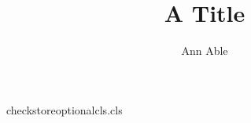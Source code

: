 \begin{filecontents*}[force]{checkstoreoptionalcls.cls}
\newcount\aucount
\def\author#1{\advance\aucount by 1 \gdef\@author{#1}}
\def\auaddr{}\newcommand{\address}[2][]{\g@addto@macro\auaddr{#1 #2\par}}
\def\place[#1]#2{\g@addto@macro\auaddr{#1 #2\par}}
\renewcommand\maketitle{\par{\@title\par}\ifnum\aucount>0 {\@author\par}{\auaddr}\fi}
\end{filecontents*}
\documentclass{checkstoreoptionalcls}
\title{A Title}\author{Ann Able}
\address[Lunar Institute]{Gravel Road}
\maketitle
Body text.

